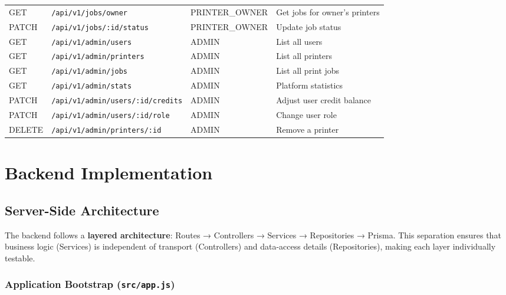 \documentclass[12pt,a4paper]{report}
\begin{document}
\begin{longtable}{C{1.4cm} L{4.8cm} L{3cm} L{4.2cm}}
  GET  & \texttt{/api/v1/jobs/owner}                  & PRINTER\_OWNER & Get jobs for owner's printers \\
  PATCH & \texttt{/api/v1/jobs/:id/status}            & PRINTER\_OWNER & Update job status \\
  GET  & \texttt{/api/v1/admin/users}                 & ADMIN      & List all users \\
  GET  & \texttt{/api/v1/admin/printers}              & ADMIN      & List all printers \\
  GET  & \texttt{/api/v1/admin/jobs}                  & ADMIN      & List all print jobs \\
  GET  & \texttt{/api/v1/admin/stats}                 & ADMIN      & Platform statistics \\
  PATCH & \texttt{/api/v1/admin/users/:id/credits}    & ADMIN      & Adjust user credit balance \\
  PATCH & \texttt{/api/v1/admin/users/:id/role}       & ADMIN      & Change user role \\
  DELETE & \texttt{/api/v1/admin/printers/:id}        & ADMIN      & Remove a printer \\
\end{longtable}

\clearpage

\chapter{Backend Implementation}

\section{Server-Side Architecture}

The backend follows a \textbf{layered architecture}: Routes → Controllers → Services →
Repositories → Prisma. This separation ensures that business logic (Services) is independent
of transport (Controllers) and data-access details (Repositories), making each layer
individually testable.

\subsection{Application Bootstrap (\texttt{src/app.js})}
\end{document}

